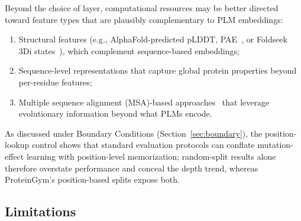 \documentclass[11pt,a4paper]{article}
\newcommand{\revised}[1]{#1}
\newcommand{\rtwo}[1]{#1}
\begin{document}
\rtwo{Beyond the choice of layer}, computational resources may be better directed toward feature types
that are plausibly complementary to PLM embeddings:
\begin{enumerate}
    \item Structural features (e.g., AlphaFold-predicted pLDDT, PAE~\cite{jumper2021alphafold},
          or Foldseek 3Di states~\cite{vankempen2024foldseek}), which complement
          sequence-based embeddings;
    \item Sequence-level representations that capture global protein properties
          beyond per-residue features;
    \item Multiple sequence alignment (MSA)-based approaches~\cite{riesselman2018deepsequence,
          hopf2017mutation} that leverage evolutionary information beyond what PLMs encode.
\end{enumerate}

As discussed under Boundary Conditions (Section~\rtwo{\ref{sec:boundary}}), \revised{the position-lookup
control shows that} standard evaluation protocols can conflate mutation-effect learning with
position-level memorization\rtwo{; random-split results alone therefore overstate
performance and conceal the depth trend, whereas ProteinGym's position-based splits
expose both}.

\subsection{Limitations}
\end{document}
